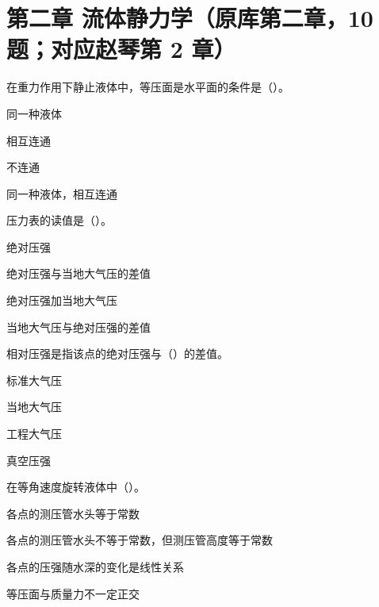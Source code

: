 \section*{第二章 流体静力学（原库第二章，10 题；对应赵琴第 2 章）}

\begin{ti}

\item[2-1] 在重力作用下静止液体中，等压面是水平面的条件是（\quad）。
\begin{choices}
\item 同一种液体
\item 相互连通
\item 不连通
\item 同一种液体，相互连通
\end{choices}

\item[2-2] 压力表的读值是（\quad）。
\begin{choices}
\item 绝对压强
\item 绝对压强与当地大气压的差值
\item 绝对压强加当地大气压
\item 当地大气压与绝对压强的差值
\end{choices}

\item[2-3] 相对压强是指该点的绝对压强与（\quad）的差值。
\begin{choices}
\item 标准大气压
\item 当地大气压
\item 工程大气压
\item 真空压强
\end{choices}

\item[2-4] 在等角速度旋转液体中（\quad）。
\begin{choices}
\item 各点的测压管水头等于常数
\item 各点的测压管水头不等于常数，但测压管高度等于常数
\item 各点的压强随水深的变化是线性关系
\item 等压面与质量力不一定正交
\end{choices}


\end{ti}
